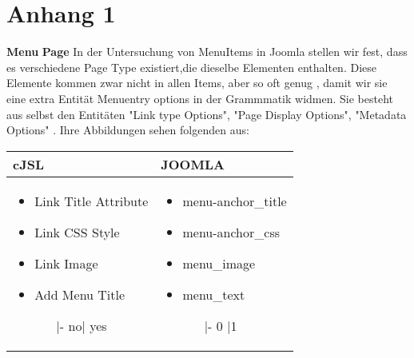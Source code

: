 \chapter{Anhang 1}
\textbf{Menu} \linebreak
\textbf{Page} \linebreak
In der Untersuchung von MenuItems in Joomla stellen wir fest, dass es verschiedene Page Type existiert,die dieselbe   Elementen enthalten. Diese Elemente kommen zwar nicht in allen Items, aber so oft genug , damit wir sie eine extra Entität  Menuentry options in der Grammmatik widmen. Sie besteht aus selbst den Entitäten "Link type Options", "Page Display Options", "Metadata Options"  . Ihre Abbildungen sehen folgenden aus:
\linebreak
\linebreak
\begin{minipage}{0.5\textwidth}
\begin{tabular}{|p{}|p{} |}
\hline
\textbf{cJSL} 
&  
\textbf{JOOMLA} \\ \hline
\begin{itemize}
\item Link Title Attribute
\item Link CSS Style
\item Link Image
\item Add Menu Title
	\begin{enumerate}
	\item[|-]no| yes
	\end{enumerate}
\end{itemize}
&
\begin{itemize}
\item menu-anchor\_title
\item menu-anchor\_css
\item menu\_image
\item menu\_text
	\begin{enumerate}
		\item[|-] 0 |1
	\end{enumerate}
\end{itemize} \\ \hline
\end{tabular}
\end{minipage}

